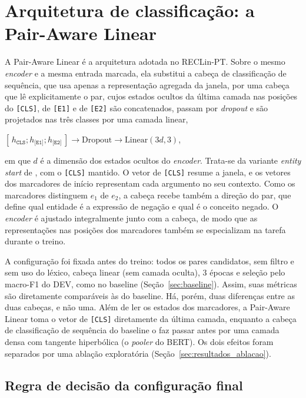 \section{Arquitetura de classificação: a Pair-Aware Linear}
\label{sec:pairaware}

A Pair-Aware Linear é a arquitetura adotada no RECLin-PT. Sobre o mesmo \emph{encoder} e a mesma entrada marcada, ela substitui a cabeça de classificação de sequência, que usa apenas a representação agregada da janela, por uma cabeça que lê explicitamente o par, cujos estados ocultos da última camada nas posições do \texttt{[CLS]}, de \texttt{[E1]} e de \texttt{[E2]} são concatenados, passam por \emph{dropout} e são projetados nas três classes por uma camada linear,
%
\begin{center}
$[\,h_{\texttt{CLS}} ; h_{\texttt{[E1]}} ; h_{\texttt{[E2]}}\,] \rightarrow
\mathrm{Dropout} \rightarrow \mathrm{Linear}(3d, 3)$,
\end{center}
%
em que $d$ é a dimensão dos estados ocultos do \emph{encoder}. Trata-se da variante
\emph{entity start} de , com o \texttt{[CLS]} mantido.
O vetor de \texttt{[CLS]} resume a janela, e os vetores dos marcadores de início
representam cada argumento no seu contexto. Como os marcadores distinguem $e_1$ de
$e_2$, a cabeça recebe também a direção do par, que define qual entidade é a
expressão de negação e qual é o conceito negado. O \emph{encoder} é ajustado
integralmente junto com a cabeça, de modo que as representações nas posições dos
marcadores também se especializam na tarefa durante o treino.

A configuração foi fixada antes do treino: todos os pares candidatos, sem filtro e
sem uso do léxico, cabeça linear (sem camada oculta), 3 épocas e seleção pelo
macro-F1 do DEV, como no baseline (Seção~\ref{sec:baseline}). Assim, suas métricas
são diretamente comparáveis às do baseline. Há, porém, duas diferenças entre as
duas cabeças, e não uma. Além de ler os estados dos marcadores, a Pair-Aware Linear
toma o vetor de \texttt{[CLS]} diretamente da última camada, enquanto a cabeça de
classificação de sequência do baseline o faz passar antes por uma camada densa com
tangente hiperbólica (o \emph{pooler} do BERT). Os dois efeitos foram separados
por uma ablação exploratória (Seção~\ref{sec:resultados_ablacao}).

\subsection{Regra de decisão da configuração final}
\label{sec:regra_final}

